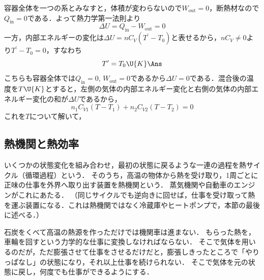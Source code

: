 \begin{reidaiunit}
\begin{kaitou}
\begin{komon}
 容器全体を一つの系とみなすと，体積が変わらないので$W_{\mathrm{out}}=0$，断熱材なので$Q_{\mathrm{in}}=0$である．よって熱力学第一法則より
       \[\Delta U=Q_{\mathrm{in}}-W_{\mathrm{out}}=0\]
       一方，内部エネルギーの変化は$\Delta U=nC_V(T^\prime-T_0)$と表せるから，$nC_V\neq 0$より$T^\prime-T_0=0$，すなわち
       \[T^\prime=T_0\U{K}\Ans\]
 こちらも容器全体では$Q_{\mathrm{in}}=0$, $W_{\mathrm{out}}=0$であるから$\Delta U=0$である．混合後の温度を$T\U{K}$とすると，左側の気体の内部エネルギー変化と右側の気体の内部エネルギー変化の和が$\Delta U$であるから，
       \[n_1C_{V1}(T-T_1)+n_2C_{V2}(T-T_2)=0\]
       これを$T$について解いて，
\end{komon}
\end{kaitou}
\end{reidaiunit}


\subsection{熱機関と熱効率}

いくつかの状態変化を組み合わせ，最初の状態に戻るような一連の過程を{\gtfamily 熱サイクル}（循環過程）という．
そのうち，{\gtfamily 高温の物体から熱を受け取り，1周ごとに正味の仕事を外界へ取り出す装置}を{\gtfamily 熱機関}という．
蒸気機関や自動車のエンジンがこれにあたる．
（同じサイクルでも逆向きに回せば，仕事を受け取って熱を運ぶ装置になる．これは熱機関ではなく冷蔵庫やヒートポンプで，本節の最後に述べる．）


石炭をくべて高温の熱源を作っただけでは機関車は進まない．
もらった熱を，車輪を回すという{\gtfamily 力学的な仕事}に変換しなければならない．
そこで気体を用いるのだが，ただ膨張させて仕事をさせるだけだと，膨張しきったところで「やりっぱなし」の状態になり，それ以上仕事を続けられない．
そこで気体を元の状態に戻し，何度でも仕事ができるようにする．

